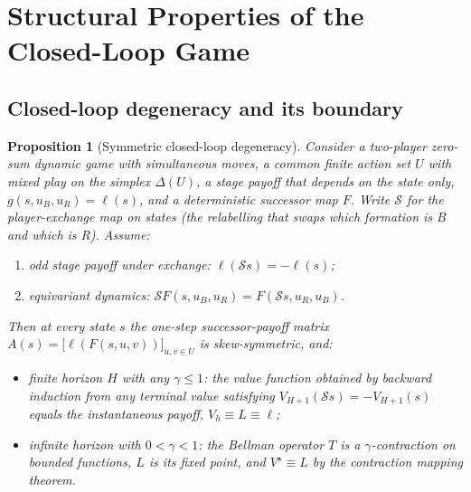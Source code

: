 \documentclass[12pt,a4paper]{article}
\newtheorem{proposition}{Proposition}
\begin{document}
\section{Structural Properties of the Closed-Loop Game}\label{sec:structural}

\subsection{Closed-loop degeneracy and its boundary}\label{sec:degeneracy}

\begin{proposition}[Symmetric closed-loop degeneracy]\label{prop:deg}
Consider a two-player zero-sum dynamic game with simultaneous moves, a
common finite action set $U$ with mixed play on the simplex $\Delta(U)$, a
stage payoff that depends on the state only, $g(s,u_B,u_R)=\ell(s)$, and a
deterministic successor map $F$.  Write
$\mathcal S$ for the \emph{player-exchange map} on states (the relabelling
that swaps which formation is B and which is R).  Assume:
\begin{enumerate}
\item[(A1)] \emph{odd stage payoff under exchange}: $\ell(\mathcal S s)
      = -\ell(s)$;
\item[(A2)] \emph{equivariant dynamics}: $\mathcal S F(s,u_B,u_R)
      = F(\mathcal S s, u_R, u_B)$.
\end{enumerate}
Then at every state $s$ the one-step successor-payoff matrix
$A(s)=\bigl[\ell(F(s,u,v))\bigr]_{u,v\in U}$ is skew-symmetric, and:
\begin{itemize}
\item[(i)] \emph{finite horizon $H$ with any $\gamma\le1$}: the value
      function obtained by backward induction from any terminal value
      satisfying $V_{H+1}(\mathcal S s)=-V_{H+1}(s)$ equals the
      instantaneous payoff, $V_h\equiv L\equiv\ell$;
\item[(ii)] \emph{infinite horizon with $0<\gamma<1$}: the Bellman
      operator $T$ is a $\gamma$-contraction on bounded functions, $L$ is
      its fixed point, and $V^\star\equiv L$ by the contraction mapping
      theorem.
\end{itemize}
\end{proposition}
\end{document}
